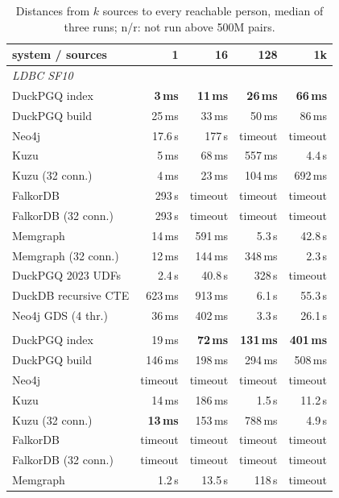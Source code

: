 \begin{table}[t]\centering\scriptsize\setlength{\tabcolsep}{2.6pt}
\caption{Distances from $k$ sources to every reachable person, median of three runs; n/r: not run above 500M pairs.}\label{tab:sources-all}
\begin{tabular}{lrrrr}\toprule
system / sources & 1 & 16 & 128 & 1k \\ \midrule
\multicolumn{5}{l}{\textit{LDBC SF10}} \\
\quad DuckPGQ index & \textbf{3\,ms} & \textbf{11\,ms} & \textbf{26\,ms} & \textbf{66\,ms} \\
\quad DuckPGQ build & 25\,ms & 33\,ms & 50\,ms & 86\,ms \\
\quad Neo4j & 17.6\,s & 177\,s & timeout & timeout \\
\quad Kuzu & 5\,ms & 68\,ms & 557\,ms & 4.4\,s \\
\quad Kuzu (32 conn.) & 4\,ms & 23\,ms & 104\,ms & 692\,ms \\
\quad FalkorDB & 293\,s & timeout & timeout & timeout \\
\quad FalkorDB (32 conn.) & 293\,s & timeout & timeout & timeout \\
\quad Memgraph & 14\,ms & 591\,ms & 5.3\,s & 42.8\,s \\
\quad Memgraph (32 conn.) & 12\,ms & 144\,ms & 348\,ms & 2.3\,s \\
\quad DuckPGQ 2023 UDFs & 2.4\,s & 40.8\,s & 328\,s & timeout \\
\quad DuckDB recursive CTE & 623\,ms & 913\,ms & 6.1\,s & 55.3\,s \\
\quad Neo4j GDS (4 thr.) & 36\,ms & 402\,ms & 3.3\,s & 26.1\,s \\
\addlinespace
\multicolumn{5}{l}{\textit{LDBC SF100}} \\
\quad DuckPGQ index & 19\,ms & \textbf{72\,ms} & \textbf{131\,ms} & \textbf{401\,ms} \\
\quad DuckPGQ build & 146\,ms & 198\,ms & 294\,ms & 508\,ms \\
\quad Neo4j & timeout & timeout & timeout & timeout \\
\quad Kuzu & 14\,ms & 186\,ms & 1.5\,s & 11.2\,s \\
\quad Kuzu (32 conn.) & \textbf{13\,ms} & 153\,ms & 788\,ms & 4.9\,s \\
\quad FalkorDB & timeout & timeout & timeout & timeout \\
\quad FalkorDB (32 conn.) & timeout & timeout & timeout & timeout \\
\quad Memgraph & 1.2\,s & 13.5\,s & 118\,s & timeout \\

\end{tabular}
\end{table}
